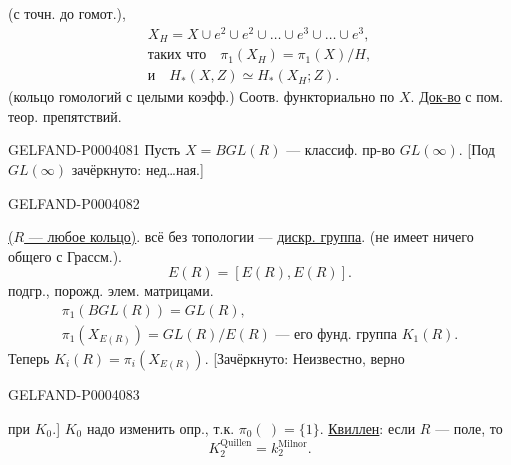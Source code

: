 (с точн. до гомот.),
\begingroup\color{black}\begin{gather*}
X_H=X\cup e^2\cup e^2\cup\dots\cup e^3\cup\dots\cup e^3,\\
\text{таких что}\quad\pi_1(X_H)=\pi_1(X)/H,\\
\text{и}\quad H_*(X,Z)\simeq H_*(X_H;Z).
\end{gather*}\endgroup
(кольцо гомологий с целыми коэфф.)
Соотв. функториально по $X$.
\underline{Док-во} с пом. теор. препятствий.


\begin{GelfandAdjacentEvidence}{GELFAND-P000408}{1}
Пусть $X=BGL(R)$ — классиф. пр-во $GL(\infty)$.
[Под $GL(\infty)$ зачёркнуто: нед…ная.]
\end{GelfandAdjacentEvidence}
\begin{GelfandAdjacentEvidence}{GELFAND-P000408}{2}


\underline{($R$ — любое кольцо)}.
всё без топологии — \underline{\underline{дискр. группа}}.
(не имеет ничего общего с Грассм.).
\begingroup\color{black}\begin{equation*}
E(R)=[E(R),E(R)].
\end{equation*}\endgroup
подгр., порожд. элем. матрицами.
\begingroup\color{black}\begin{gather*}
\pi_1(BGL(R))=GL(R),\\
\pi_1(X_{E(R)})=GL(R)/E(R)\text{ — его фунд. группа }K_1(R).
\end{gather*}\endgroup
Теперь $K_i(R)=\pi_i(X_{E(R)})$.
[Зачёркнуто: Неизвестно, верно
\end{GelfandAdjacentEvidence}
\begin{GelfandAdjacentEvidence}{GELFAND-P000408}{3}


при $K_0$.]
$K_0$ надо изменить опр., т.к. $\pi_0(\ )=\{1\}$.
\underline{Квиллен}: если $R$ — поле, то
\begingroup\color{black}\begin{equation*}
K_2^{\mathrm{Quillen}}=k_2^{\mathrm{Milnor}}.
\end{equation*}\endgroup
{}
\end{GelfandAdjacentEvidence}
